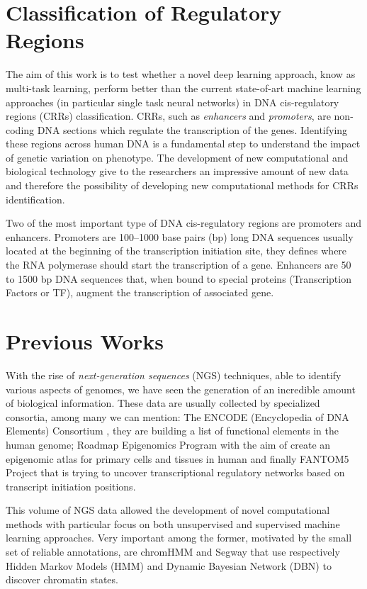 \section{Classification of Regulatory Regions}
The aim of this work is to test whether a novel deep learning approach, know as multi-task learning, perform better than the current state-of-art machine learning approaches (in particular single task neural networks) in DNA cis-regulatory regions (CRRs) classification. CRRs, such as \emph{enhancers} and \emph{promoters}, are non-coding DNA sections which regulate the transcription of the genes. Identifying these regions across human DNA is a fundamental step to understand the impact of genetic variation on phenotype. The development of new computational and biological technology give to the researchers an impressive amount of new data and therefore the possibility of developing new computational methods for CRRs identification.

Two of the most important type of DNA cis-regulatory regions are promoters and enhancers. Promoters are 100–1000 base pairs (bp) long DNA sequences usually located at the beginning of the transcription initiation site, they defines where the RNA polymerase should start the transcription of a gene. Enhancers are 50 to 1500 bp DNA sequences that, when bound to special proteins (Transcription Factors or TF), augment the transcription of associated gene.

\section{Previous Works}
With the rise of \emph{next-generation sequences} (NGS) techniques, able to identify various aspects of genomes, we have seen the generation of an incredible amount of biological information. These data are usually collected by specialized consortia, among many we can mention: The ENCODE (Encyclopedia of DNA Elements) Consortium \cite{ENCODE_data}, they are building a list of functional elements in the human genome; Roadmap Epigenomics Program \cite{ROADMAP} with the aim of create an epigenomic atlas for primary cells and tissues in human and finally FANTOM5 Project \cite{FANTOM_data} that is trying to uncover transcriptional regulatory networks based on transcript initiation positions.

This volume of NGS data allowed the development of novel computational methods with particular focus on both unsupervised and supervised machine learning approaches. Very important among the former, motivated by the small set of reliable annotations, are chromHMM \cite{ernst2012chromhmm} and Segway \cite{HoffmanSegway} that use respectively Hidden Markov Models (HMM) and Dynamic Bayesian Network (DBN) to discover chromatin states.
 
